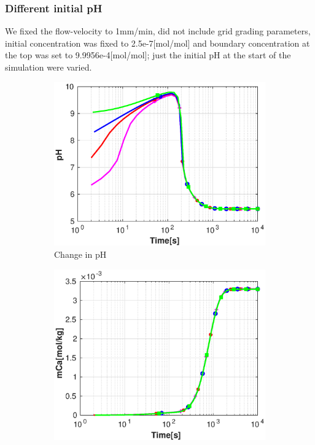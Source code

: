 \subsubsection*{Different initial pH} \label{ssec:diffpH}
We fixed the flow-velocity to 1mm/min, did not include grid grading parameters, initial  concentration was fixed to 
2.5e-7[mol/mol] and boundary concentration at the top was set to 9.9956e-4[mol/mol]; just the initial pH at the start of the simulation were varied.

\begin{figure}[!h]
        \centering
    \begin{subfigure}{.5\linewidth}
            \centering
        \includegraphics[width=\textwidth]{PICTURES/with_pH_pH.eps}
        \caption{Change in pH}
        \label{fig:pHpH}
    \end{subfigure}%
        \hfill
    \begin{subfigure}{.5\linewidth}
            \centering
        \includegraphics[width=\textwidth]{PICTURES/with_pH_mCa.eps}

\end{subfigure}
\end{figure}
